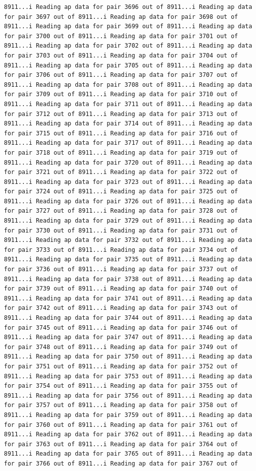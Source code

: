 \documentclass[
]{article}
\begin{document}
\begin{verbatim}
8911...i Reading ap data for pair 3696 out of 8911...i Reading ap data for pair 3697 out of 8911...i Reading ap data for pair 3698 out of 8911...i Reading ap data for pair 3699 out of 8911...i Reading ap data for pair 3700 out of 8911...i Reading ap data for pair 3701 out of 8911...i Reading ap data for pair 3702 out of 8911...i Reading ap data for pair 3703 out of 8911...i Reading ap data for pair 3704 out of 8911...i Reading ap data for pair 3705 out of 8911...i Reading ap data for pair 3706 out of 8911...i Reading ap data for pair 3707 out of 8911...i Reading ap data for pair 3708 out of 8911...i Reading ap data for pair 3709 out of 8911...i Reading ap data for pair 3710 out of 8911...i Reading ap data for pair 3711 out of 8911...i Reading ap data for pair 3712 out of 8911...i Reading ap data for pair 3713 out of 8911...i Reading ap data for pair 3714 out of 8911...i Reading ap data for pair 3715 out of 8911...i Reading ap data for pair 3716 out of 8911...i Reading ap data for pair 3717 out of 8911...i Reading ap data for pair 3718 out of 8911...i Reading ap data for pair 3719 out of 8911...i Reading ap data for pair 3720 out of 8911...i Reading ap data for pair 3721 out of 8911...i Reading ap data for pair 3722 out of 8911...i Reading ap data for pair 3723 out of 8911...i Reading ap data for pair 3724 out of 8911...i Reading ap data for pair 3725 out of 8911...i Reading ap data for pair 3726 out of 8911...i Reading ap data for pair 3727 out of 8911...i Reading ap data for pair 3728 out of 8911...i Reading ap data for pair 3729 out of 8911...i Reading ap data for pair 3730 out of 8911...i Reading ap data for pair 3731 out of 8911...i Reading ap data for pair 3732 out of 8911...i Reading ap data for pair 3733 out of 8911...i Reading ap data for pair 3734 out of 8911...i Reading ap data for pair 3735 out of 8911...i Reading ap data for pair 3736 out of 8911...i Reading ap data for pair 3737 out of 8911...i Reading ap data for pair 3738 out of 8911...i Reading ap data for pair 3739 out of 8911...i Reading ap data for pair 3740 out of 8911...i Reading ap data for pair 3741 out of 8911...i Reading ap data for pair 3742 out of 8911...i Reading ap data for pair 3743 out of 8911...i Reading ap data for pair 3744 out of 8911...i Reading ap data for pair 3745 out of 8911...i Reading ap data for pair 3746 out of 8911...i Reading ap data for pair 3747 out of 8911...i Reading ap data for pair 3748 out of 8911...i Reading ap data for pair 3749 out of 8911...i Reading ap data for pair 3750 out of 8911...i Reading ap data for pair 3751 out of 8911...i Reading ap data for pair 3752 out of 8911...i Reading ap data for pair 3753 out of 8911...i Reading ap data for pair 3754 out of 8911...i Reading ap data for pair 3755 out of 8911...i Reading ap data for pair 3756 out of 8911...i Reading ap data for pair 3757 out of 8911...i Reading ap data for pair 3758 out of 8911...i Reading ap data for pair 3759 out of 8911...i Reading ap data for pair 3760 out of 8911...i Reading ap data for pair 3761 out of 8911...i Reading ap data for pair 3762 out of 8911...i Reading ap data for pair 3763 out of 8911...i Reading ap data for pair 3764 out of 8911...i Reading ap data for pair 3765 out of 8911...i Reading ap data for pair 3766 out of 8911...i Reading ap data for pair 3767 out of 
\end{verbatim}
\end{document}
